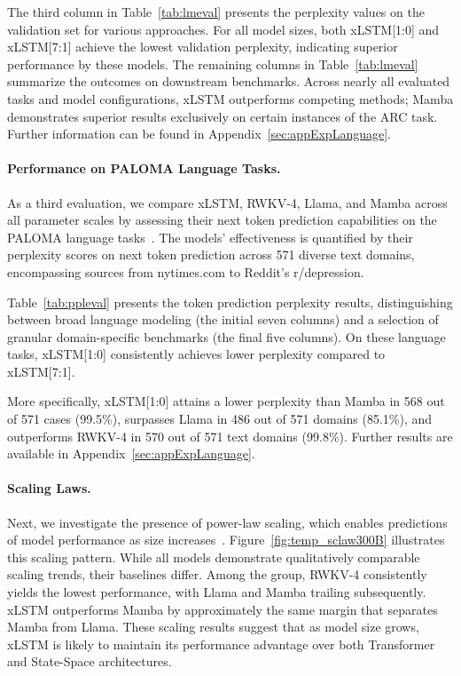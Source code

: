 The third column in Table~\ref{tab:lmeval} presents the perplexity values on the validation set for various approaches. For all model sizes, both xLSTM[1:0] and xLSTM[7:1] achieve the lowest validation perplexity, indicating superior performance by these models. The remaining columns in Table~\ref{tab:lmeval} summarize the outcomes on downstream benchmarks. Across nearly all evaluated tasks and model configurations, xLSTM outperforms competing methods; Mamba demonstrates superior results exclusively on certain instances of the ARC task. Further information can be found in Appendix~\ref{sec:appExpLanguage}.

\paragraph{Performance on PALOMA Language Tasks.} As a third evaluation, we compare xLSTM, RWKV-4, Llama, and Mamba across all parameter scales by assessing their next token prediction capabilities on the PALOMA language tasks~\citep{Magnusson:23arxivshort}. The models' effectiveness is quantified by their perplexity scores on next token prediction across 571 diverse text domains, encompassing sources from nytimes.com to Reddit’s r/depression.

Table~\ref{tab:ppleval} presents the token prediction perplexity results, distinguishing between broad language modeling (the initial seven columns) and a selection of granular domain-specific benchmarks (the final five columns). On these language tasks, xLSTM[1:0] consistently achieves lower perplexity compared to xLSTM[7:1].

More specifically, xLSTM[1:0] attains a lower perplexity than Mamba in 568 out of 571 cases (99.5\%), surpasses Llama in 486 out of 571 domains (85.1\%), and outperforms RWKV-4 in 570 out of 571 text domains (99.8\%). Further results are available in Appendix~\ref{sec:appExpLanguage}.

\paragraph{Scaling Laws.} Next, we investigate the presence of power-law scaling, which enables predictions of model performance as size increases~\citep{Kaplan:20,Brown:20short}. Figure~\ref{fig:temp_sclaw300B} illustrates this scaling pattern. While all models demonstrate qualitatively comparable scaling trends, their baselines differ. Among the group, RWKV-4 consistently yields the lowest performance, with Llama and Mamba trailing subsequently. xLSTM outperforms Mamba by approximately the same margin that separates Mamba from Llama. These scaling results suggest that as model size grows, xLSTM is likely to maintain its performance advantage over both Transformer and State-Space architectures.

